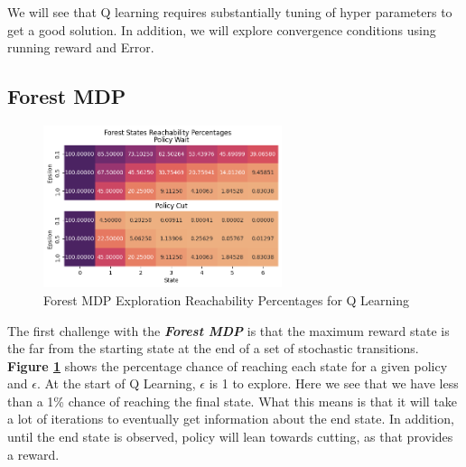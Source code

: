 \documentclass[letterpaper]{article} %
\begin{document}
We will see that Q learning requires substantially tuning of hyper parameters to get a good solution.  In addition, we will explore convergence conditions using running reward and Error.

\subsection{Forest MDP} 

\begin{figure}[!htb]
\centering
\includegraphics[width=2.75in]{Figures/Forest_States_Reachability_Percentages.png}
\caption{Forest MDP Exploration Reachability Percentages for Q Learning}
\label{fig:forest_q_reachability}
\end{figure}
The first challenge with the \textbf{\emph{Forest MDP}} is that the maximum reward state is the far from the starting state at the end of a set of stochastic transitions.   \textbf{Figure \ref{fig:forest_q_reachability}} shows the percentage chance of reaching each state for a given policy and $\epsilon$.  At the start of Q Learning, $\epsilon$ is 1 to explore.  Here we see that we have less than a 1\% chance of reaching the final state.  What this means is that it will take a lot of iterations to eventually get information about the end state.  In addition, until the end state is observed, policy will lean towards cutting, as that provides a reward.  
\end{document}
